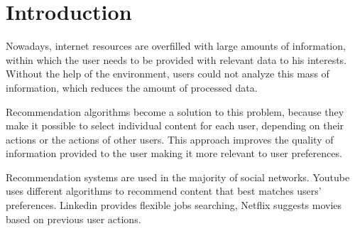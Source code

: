 \section{Introduction}\label{sec:introduction}
Nowadays, internet resources are overfilled with large amounts of information, within which the user needs to be provided with relevant data to his interests. Without the help of the environment, users could not analyze this mass of information, which reduces the amount of processed data\cite{InternetBigData}.

Recommendation algorithms become a solution to this problem, because they make it possible to select individual content for each user, depending on their actions or the actions of other users. This approach improves the quality of information provided to the user making it more relevant to user preferences\cite{InternetBigData}.

Recommendation systems are used in the majority of social networks. Youtube uses different algorithms to recommend content that best matches users' preferences. Linkedin provides flexible jobs searching, Netflix suggests movies based on previous user actions\cite{CBF_In_Social_Networks}.